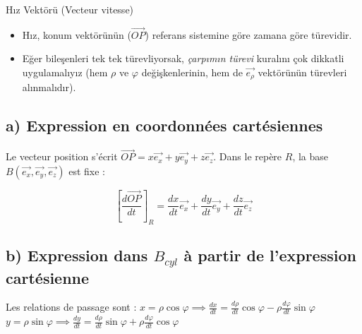 \documentclass[11pt,a4paper]{article}
\begin{document}
\begin{theoriebox}{Hız Vektörü (Vecteur vitesse)}
\begin{itemize}
    \item Hız, konum vektörünün ($\vec{OP}$) referans sistemine göre zamana göre türevidir.
    \item Eğer bileşenleri tek tek türevliyorsak, \textit{çarpımın türevi} kuralını çok dikkatli uygulamalıyız (hem $\rho$ ve $\varphi$ değişkenlerinin, hem de $\vec{e_\rho}$ vektörünün türevleri alınmalıdır).
\end{itemize}
\end{theoriebox}

\subsection*{a) Expression en coordonnées cartésiennes}
Le vecteur position s'écrit $\vec{OP} = x \vec{e_x} + y \vec{e_y} + z \vec{e_z}$.
Dans le repère $R$, la base $B (\vec{e_x}, \vec{e_y}, \vec{e_z})$ est fixe :
\begin{sonucbox}
$$ \left[\frac{d\vec{OP}}{dt}\right]_R = \frac{dx}{dt} \vec{e_x} + \frac{dy}{dt} \vec{e_y} + \frac{dz}{dt} \vec{e_z} $$
\end{sonucbox}

\subsection*{b) Expression dans $B_{cyl}$ à partir de l'expression cartésienne}
Les relations de passage sont :
$x = \rho \cos\varphi \implies \frac{dx}{dt} = \frac{d\rho}{dt} \cos\varphi - \rho \frac{d\varphi}{dt} \sin\varphi$ \\
$y = \rho \sin\varphi \implies \frac{dy}{dt} = \frac{d\rho}{dt} \sin\varphi + \rho \frac{d\varphi}{dt} \cos\varphi$
\end{document}
